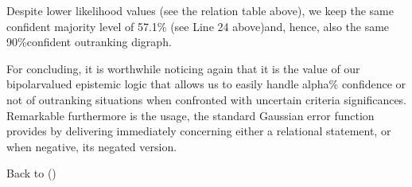 \documentclass[a4paper,10pt,english]{sphinxhowto}
\begin{document}
Despite lower likelihood values (see the  relation table above), we keep the same confident majority level of 57.1\% (see Line 24 above)and, hence, also the same 90\%\sphinxhyphen{}confident outranking digraph.

For concluding, it is worthwhile noticing again that it is the  value of our bipolar\sphinxhyphen{}valued epistemic logic that allows us to easily handle alpha\% confidence or not of outranking situations when confronted with uncertain criteria significances. Remarkable furthermore is the usage, the standard Gaussian error function provides by delivering  immediately concerning either a  relational statement, or when negative, its negated version.

Back to {\hyperref[\detokenize{tutorial:tutorial-label}]{}} ()
\end{document}
